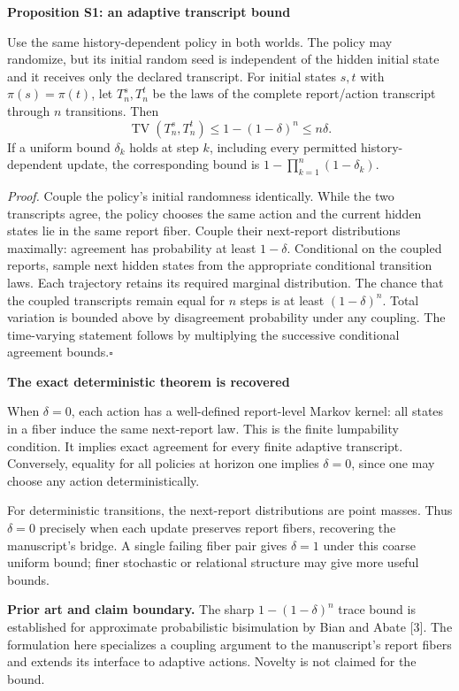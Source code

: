 \documentclass[11pt,letterpaper]{article}
\newcommand{\sub}[1]{{\bfseries\color{ink}#1}\par}
\newcommand{\note}[1]{\par\vspace{3pt}\noindent\colorbox{pale}{\parbox{\dimexpr\linewidth-2\fboxsep}{#1}}\par\vspace{3pt}}
\newcommand{\TV}{\operatorname{TV}}
\begin{document}
\sub{Proposition S1: an adaptive transcript bound}
Use the same history-dependent policy in both worlds. The policy may randomize, but its initial random seed is independent of the hidden initial state and it receives only the declared transcript. For initial states $s,t$ with $\pi(s)=\pi(t)$, let $T_n^s,T_n^t$ be the laws of the complete report/action transcript through $n$ transitions. Then
\[
\boxed{\quad \TV(T_n^s,T_n^t)\leq1-(1-\delta)^n\leq n\delta.\quad}
\]
If a uniform bound $\delta_k$ holds at step $k$, including every permitted history-dependent update, the corresponding bound is $1-\prod_{k=1}^n(1-\delta_k)$.

\textit{Proof.} Couple the policy's initial randomness identically. While the two transcripts agree, the policy chooses the same action and the current hidden states lie in the same report fiber. Couple their next-report distributions maximally: agreement has probability at least $1-\delta$. Conditional on the coupled reports, sample next hidden states from the appropriate conditional transition laws. Each trajectory retains its required marginal distribution. The chance that the coupled transcripts remain equal for $n$ steps is at least $(1-\delta)^n$. Total variation is bounded above by disagreement probability under any coupling. The time-varying statement follows by multiplying the successive conditional agreement bounds.\hfill$\square$

\sub{The exact deterministic theorem is recovered}
When $\delta=0$, each action has a well-defined report-level Markov kernel: all states in a fiber induce the same next-report law. This is the finite lumpability condition. It implies exact agreement for every finite adaptive transcript. Conversely, equality for all policies at horizon one implies $\delta=0$, since one may choose any action deterministically.

For deterministic transitions, the next-report distributions are point masses. Thus $\delta=0$ precisely when each update preserves report fibers, recovering the manuscript's bridge. A single failing fiber pair gives $\delta=1$ under this coarse uniform bound; finer stochastic or relational structure may give more useful bounds.

\note{\textbf{Prior art and claim boundary.} The sharp $1-(1-\delta)^n$ trace bound is established for approximate probabilistic bisimulation by Bian and Abate [3]. The formulation here specializes a coupling argument to the manuscript's report fibers and extends its interface to adaptive actions. Novelty is not claimed for the bound.}
\end{document}

